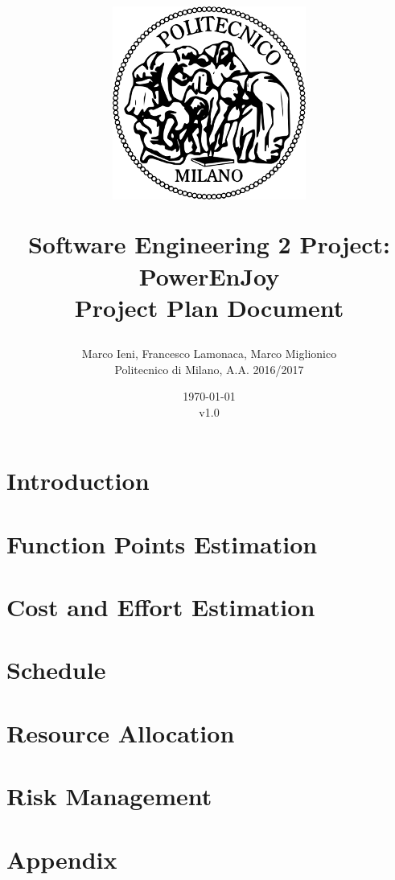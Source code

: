 \documentclass[a4paper, 12pt]{report}
\title{
	\begin{figure}[h]
		\centering
		\includegraphics{../common_resources/logo_polimi.png}
	\end{figure}
	\vspace{30px}
	Software Engineering 2 Project: PowerEnJoy \\ \vspace{1em}
	\textbf{P}roject \textbf{P}lan \textbf{D}ocument
}
\author{Marco Ieni, Francesco Lamonaca, Marco Miglionico\\Politecnico di Milano, A.A. 2016/2017}
\date{\today\\v1.0}
\begin{document}
\maketitle
\tableofcontents
\chapter{Introduction}



\chapter{Function Points Estimation}
\label{ch:function_points_estimation}









\chapter{Cost and Effort Estimation}
\label{ch:cost_effor_estimation}




\chapter{Schedule}


\chapter{Resource Allocation}


\chapter{Risk Management}

\appendix
\chapter{Appendix}

\end{document}
